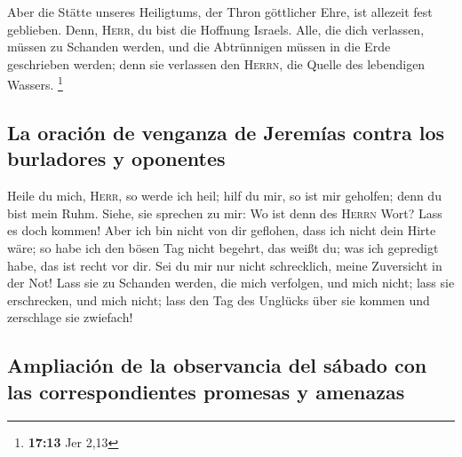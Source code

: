  Aber die Stätte unseres Heiligtums, der Thron göttlicher
Ehre, ist allezeit fest geblieben.  Denn, \textsc{Herr},
du bist die Hoffnung Israels. Alle, die dich verlassen, müssen zu
Schanden werden, und die Abtrünnigen müssen in die Erde geschrieben
werden; denn sie verlassen den \textsc{Herrn}, die Quelle des lebendigen
Wassers. \footnote{\textbf{17:13} Jer 2,13}

\hypertarget{la-oraciuxf3n-de-venganza-de-jeremuxedas-contra-los-burladores-y-oponentes}{%
\subsection{La oración de venganza de Jeremías contra los burladores y
oponentes}\label{la-oraciuxf3n-de-venganza-de-jeremuxedas-contra-los-burladores-y-oponentes}}

 Heile du mich, \textsc{Herr}, so werde ich heil; hilf du
mir, so ist mir geholfen; denn du bist mein Ruhm.  Siehe,
sie sprechen zu mir: Wo ist denn des \textsc{Herrn} Wort? Lass es doch
kommen!  Aber ich bin nicht von dir geflohen, dass ich
nicht dein Hirte wäre; so habe ich den bösen Tag nicht begehrt, das
weißt du; was ich gepredigt habe, das ist recht vor dir. 
Sei du mir nur nicht schrecklich, meine Zuversicht in der Not!
 Lass sie zu Schanden werden, die mich verfolgen, und
mich nicht; lass sie erschrecken, und mich nicht; lass den Tag des
Unglücks über sie kommen und zerschlage sie zwiefach!

\hypertarget{ampliaciuxf3n-de-la-observancia-del-suxe1bado-con-las-correspondientes-promesas-y-amenazas}{%
\subsection{Ampliación de la observancia del sábado con las
correspondientes promesas y
amenazas}\label{ampliaciuxf3n-de-la-observancia-del-suxe1bado-con-las-correspondientes-promesas-y-amenazas}}

